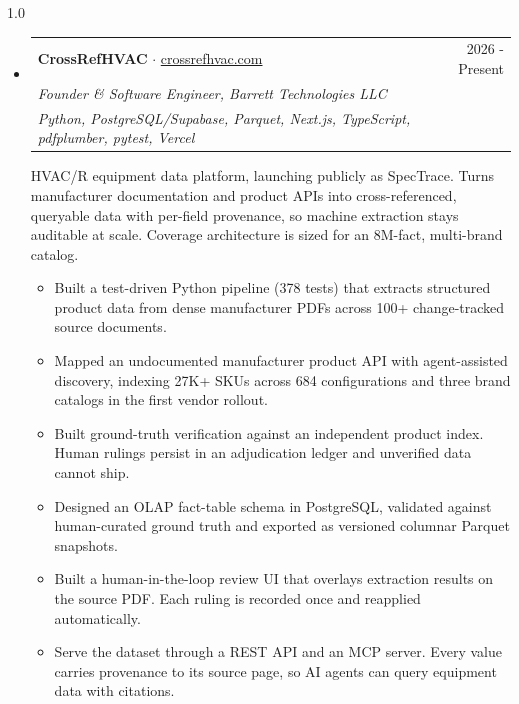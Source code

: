 \documentclass[letterpaper,10pt]{article}
\begin{document}
\begin{spacing}{1.0}
\begin{itemize}[leftmargin=*]
\item[\raisebox{0.5\baselineskip}{\textbullet}]
	\begin{tabular*}{7.3in}{l@{\extracolsep{\fill}}r}
		\textbf{CrossRefHVAC} \textnormal{$\cdot$ \href{https://crossrefhvac.com}{crossrefhvac.com}} & 2026 - Present \\
		\textit{Founder \& Software Engineer, Barrett Technologies LLC} & \\
		{\small\textit{Python, PostgreSQL/Supabase, Parquet, Next.js, TypeScript, pdfplumber, pytest, Vercel}} \\[0.05in]
	\end{tabular*}
	\vspace{0.0in}
	\parbox{\linewidth}{HVAC/R equipment data platform, launching publicly as SpecTrace. Turns manufacturer documentation and product APIs into cross-referenced, queryable data with per-field provenance, so machine extraction stays auditable at scale. Coverage architecture is sized for an 8M-fact, multi-brand catalog.}
	\vspace{-0.1in}
	\begin{itemize}[leftmargin=*]
	\setlength\itemsep{0.0em}
		\item{Built a test-driven Python pipeline (378 tests) that extracts structured product data from dense manufacturer PDFs across 100+ change-tracked source documents.}
		\item{Mapped an undocumented manufacturer product API with agent-assisted discovery, indexing 27K+ SKUs across 684 configurations and three brand catalogs in the first vendor rollout.}
		\item{Built ground-truth verification against an independent product index. Human rulings persist in an adjudication ledger and unverified data cannot ship.}
		\item{Designed an OLAP fact-table schema in PostgreSQL, validated against human-curated ground truth and exported as versioned columnar Parquet snapshots.}
		\item{Built a human-in-the-loop review UI that overlays extraction results on the source PDF. Each ruling is recorded once and reapplied automatically.}
		\item{Serve the dataset through a REST API and an MCP server. Every value carries provenance to its source page, so AI agents can query equipment data with citations.}
	\end{itemize}


\end{itemize}
\end{spacing}
\end{document}
